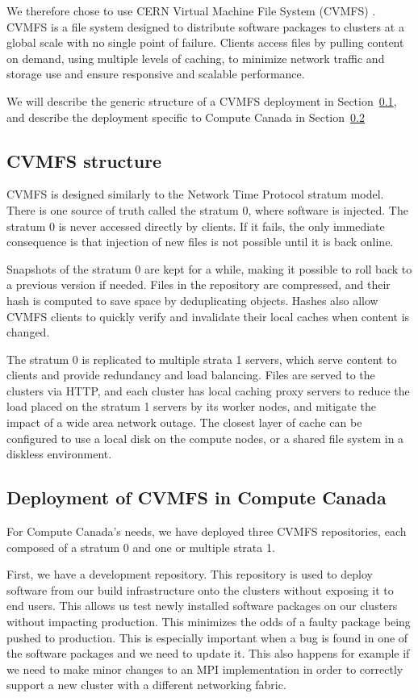 \documentclass[sigconf]{acmart}
\begin{document}
We therefore chose to use CERN Virtual Machine File System (CVMFS) \cite{CVMFS}. CVMFS is a file system designed to distribute software packages to clusters at a global scale with no single point of failure. Clients access files by pulling content on demand, using multiple levels of caching, to minimize network traffic and storage use and ensure responsive and scalable performance.

We will describe the generic structure of a CVMFS deployment in Section~\ref{sub:CVMFS_structure}, and describe the deployment specific to Compute Canada in Section~\ref{sub:CVMFS_in_CC}

\subsection{CVMFS structure}
\label{sub:CVMFS_structure}
CVMFS is designed similarly to the Network Time Protocol stratum model. There is one source of truth called the stratum 0, where software is injected.  The stratum 0 is never accessed directly by clients. If it fails, the only immediate consequence is that injection of new files is not possible until it is back online.

Snapshots of the stratum 0 are kept for a while, making it possible to roll back to a previous version if needed. Files in the repository are compressed, and their hash is computed to save space by deduplicating objects. Hashes also allow CVMFS clients to quickly verify and invalidate their local caches when content is changed.

The stratum 0 is replicated to multiple strata 1 servers, which serve content to clients and provide redundancy and load balancing. Files are served to the clusters via HTTP, and each cluster has local caching proxy servers to reduce the load placed on the stratum 1 servers by its worker nodes, and mitigate the impact of a wide area network outage. The closest layer of cache can be configured to use a local disk on the compute nodes, or a shared file system in a diskless environment.

\subsection{Deployment of CVMFS in Compute Canada}
\label{sub:CVMFS_in_CC}
For Compute Canada's needs, we have deployed three CVMFS repositories, each composed of a stratum 0 and one or multiple strata 1. 

First, we have a development repository. This repository is used to deploy software from our build infrastructure onto the clusters without exposing it to end users. This allows us test newly installed software packages on our clusters without impacting production. This minimizes the odds of a faulty package being pushed to production. This is especially important when a bug is found in one of the software packages and we need to update it. This also happens for example if we need to make minor changes to an MPI implementation in order to correctly support a new cluster with a different networking fabric. 
\end{document}
